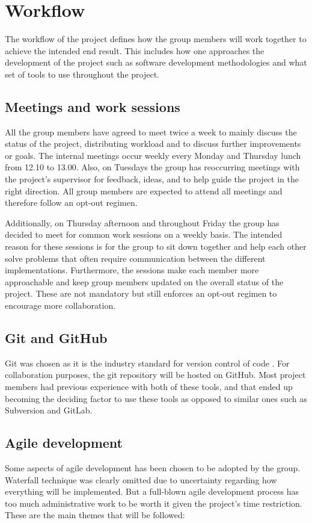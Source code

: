 \section{Workflow}

The workflow of the project defines how the group members will work together to achieve the intended end result.
This includes how one approaches the development of the project such as software development methodologies and what set of tools to use throughout the project.

\subsection{Meetings and work sessions} 
All the group members have agreed to meet twice a week to mainly discuss the status of the project, distributing workload and to discuss further improvements or goals.
The internal meetings occur weekly every Monday and Thursday lunch from 12.10 to 13.00.
Also, on Tuesdays the group has reoccurring meetings with the project's supervisor for feedback, ideas, and to help guide the project in the right direction.
All group members are expected to attend all meetings and therefore follow an opt-out regimen.

Additionally, on Thursday afternoon and throughout Friday the group has decided to meet for common work sessions on a weekly basis.
The intended reason for these sessions is for the group to sit down together and help each other solve problems that often require communication between the different implementations.
Furthermore, the sessions make each member more approachable and keep group members updated on the overall status of the project.
These are not mandatory but still enforces an opt-out regimen to encourage more collaboration.

\subsection{Git and GitHub}
Git was chosen as it is the industry standard for version control of code \cite{git_industry_standard}.
For collaboration purposes, the git repository will be hosted on GitHub.
Most project members had previous experience with both of these tools, and that ended up becoming the deciding factor to use these tools as opposed to similar ones such as Subversion and GitLab.

\subsection{Agile development}
Some aspects of agile development has been chosen to be adopted by the group. 
Waterfall technique was clearly omitted due to uncertainty regarding how everything will be implemented. 
But a full-blown agile development process has too much administrative work to be worth it given the project's time restriction.
These are the main themes that will be followed:


